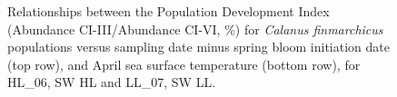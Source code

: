 \documentclass[12pt]{article}\usepackage[]{graphicx}\usepackage[]{color}
\begin{document}
\begin{landscapepage}
\begin{figure}[htb]

{\centering {} 

}

\caption{Relationships between the Population Development Index (Abundance CI-III/Abundance CI-VI, \%) for \emph{Calanus finmarchicus} populations versus sampling date minus spring bloom initiation date (top row), and April sea surface temperature (bottom row), for HL\_06, SW HL and LL\_07, SW LL.}\label{fig:figure33}
\end{figure}
\end{landscapepage}
\clearpage
\end{document}
